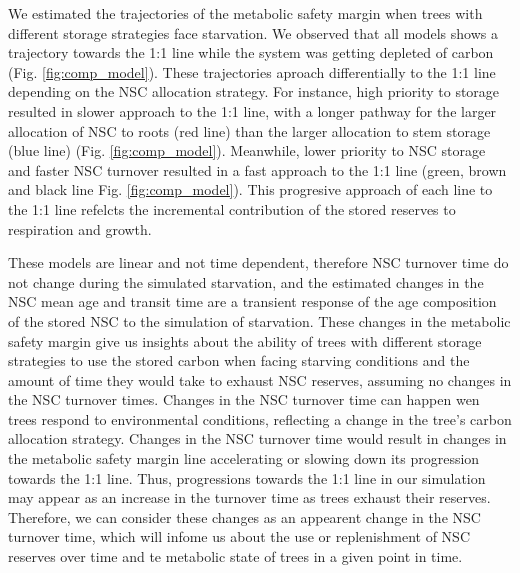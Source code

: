 \documentclass{article}
\begin{document}
We estimated the trajectories of the metabolic safety margin when trees with different storage strategies face starvation. 
We observed that all models shows a trajectory towards the 1:1 line while the system was getting depleted of carbon (Fig. \ref{fig:comp_model}). 
These trajectories aproach differentially to the 1:1 line depending on the NSC allocation strategy. 
For instance, high priority to storage resulted in slower approach to the 1:1 line, with a longer pathway for the larger allocation of NSC to roots (red line) than the larger allocation to stem storage (blue line) (Fig. \ref{fig:comp_model}).
Meanwhile, lower priority to NSC storage and faster NSC turnover resulted in a fast approach to the 1:1 line (green, brown and black line Fig. \ref{fig:comp_model}). 
This progresive approach of each line to the 1:1 line refelcts the incremental contribution of the stored reserves to respiration and growth.%

These models are linear and not time dependent, therefore NSC turnover time do not change during the simulated starvation, and the estimated changes in the NSC mean age and transit time are a transient response of the age composition of the stored NSC to the simulation of starvation.
These changes in the metabolic safety margin give us insights about the ability of trees with different storage strategies to use the stored carbon when facing starving conditions and the amount of time they would take to exhaust NSC reserves, assuming no changes in the NSC turnover times. 
Changes in the NSC turnover time can happen wen trees respond to environmental conditions, reflecting a change in the tree's carbon allocation strategy.
Changes in the NSC turnover time would result in changes in the metabolic safety margin line accelerating or slowing down its progression towards the 1:1 line.    
Thus, progressions towards the 1:1 line in our simulation may appear as an increase in the turnover time as trees exhaust their reserves. 
Therefore, we can consider these changes as an appearent change in the NSC turnover time, which will infome us about the use or replenishment of NSC reserves over time and te metabolic state of trees in a given point in time. 
\end{document}
